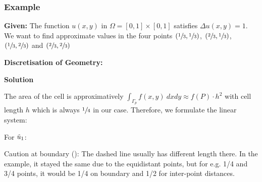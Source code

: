 
\subsubsection{Example}

\textbf{Given:} The function $u(x,y)$ in $\Omega=[0,1]\times[0,1]$ satisfies $\Delta u(x,y) = 1$.
We want to find approximate values in the four points 
$(\sfrac{1}{3},\sfrac{1}{3})$, $(\sfrac{2}{3}, \sfrac{1}{3})$,
$(\sfrac{1}{3}, \sfrac{2}{3})$ and $(\sfrac{2}{3}, \sfrac{2}{3})$

\textbf{Discretisation of Geometry:}


\textbf{Solution}

The area of the cell is approximatively 
$\int_{\Gamma_p} f(x,y)\ dxdy \approx f(P)\cdot h^2$ with cell length $h$ which is always
$\sfrac{1}{4}$ in our case. Therefore, we formulate the linear system:

For $\tilde{u}_1$:

{\color{gray}
    Caution at boundary (\faWarning):
    The dashed line usually has different length there.
    In the example, it stayed the same due to the equidistant points, but for e.g. 1/4 and 3/4 points,
    it would be 1/4 on boundary and 1/2 for inter-point distances.
}

